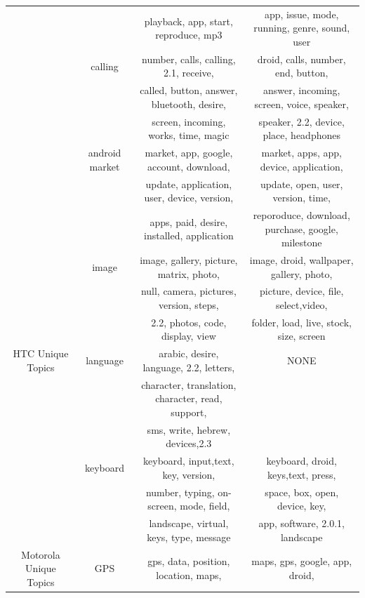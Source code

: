 \documentclass[10pt, conference, compsocconf]{IEEEtran}
\begin{document}
\begin{table}[!htb]
\begin{tabular}{|c||c||c||c|}
&&playback, app, start, reproduce, mp3 &app, issue, mode, running, genre, sound, user\\ \cline{2-4}
           
&calling& number, calls, calling, 2.1, receive, &droid, calls, number, end, button, \\
&& called, button, answer, bluetooth, desire,  &answer, incoming, screen, voice, speaker, \\ 

&& screen, incoming, works, time, magic & speaker, 2.2, device, place, headphones\\ \cline{2-4}
           
&android market& market, app, google, account, download, &market, apps, app, device, application,  \\

&&update, application, user, device, version, &update, open, user, version, time, \\ 
           
&&apps, paid, desire, installed, application & reporoduce, download, purchase, google, milestone\\ \cline{2-4}   
        
&image & image, gallery, picture, matrix, photo,  &image, droid, wallpaper, gallery, photo,\\
&&null, camera, pictures, version, steps,& picture, device,	file, select,video,\\

&&2.2, photos, code, display, view & folder, load, live, stock, size, screen\\

\hline
HTC Unique Topics & language 
&arabic, desire, language, 2.2, letters, & NONE\\

&&character, translation, character, read, support,& \\

&&sms, write, hebrew, devices,2.3 & \\ \cline{2-4}


& keyboard &keyboard, input,text, key, version,& keyboard, droid, keys,text, press, \\
&& number, typing, on-screen, mode, field, & space, box, open, device, key, \\
&&landscape, virtual, keys, type, message & app, software, 2.0.1, landscape \\
           
           
\hline
Motorola Unique Topics 
& GPS &gps, data, position, location, maps, & maps, gps, google, app, droid, \\


\end{tabular}
\end{table}
\end{document}

